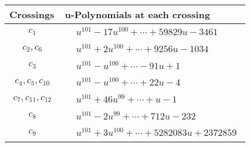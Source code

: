 \documentclass[1p]{elsarticle_modified}
\theoremstyle{definition}
\begin{document}
\begin{tabular}{m{50pt}|m{274pt}}
Crossings & \hspace{64pt}u-Polynomials at each crossing \\
\hline $$\begin{aligned}c_{1}\end{aligned}$$&$\begin{aligned}
&u^{101}-17 u^{100}+\cdots+59829 u-3461
\end{aligned}$\\
\hline $$\begin{aligned}c_{2},c_{6}\end{aligned}$$&$\begin{aligned}
&u^{101}+2 u^{100}+\cdots+9256 u-1034
\end{aligned}$\\
\hline $$\begin{aligned}c_{3}\end{aligned}$$&$\begin{aligned}
&u^{101}- u^{100}+\cdots-91 u+1
\end{aligned}$\\
\hline $$\begin{aligned}c_{4},c_{5},c_{10}\end{aligned}$$&$\begin{aligned}
&u^{101}- u^{100}+\cdots+22 u-4
\end{aligned}$\\
\hline $$\begin{aligned}c_{7},c_{11},c_{12}\end{aligned}$$&$\begin{aligned}
&u^{101}+46 u^{99}+\cdots+u-1
\end{aligned}$\\
\hline $$\begin{aligned}c_{8}\end{aligned}$$&$\begin{aligned}
&u^{101}-2 u^{99}+\cdots+712 u-232
\end{aligned}$\\
\hline $$\begin{aligned}c_{9}\end{aligned}$$&$\begin{aligned}
&u^{101}+3 u^{100}+\cdots+5282083 u+2372859
\end{aligned}$\\
\hline
\end{tabular}\\~\\
\newpage\renewcommand{\arraystretch}{1}
\end{document}
